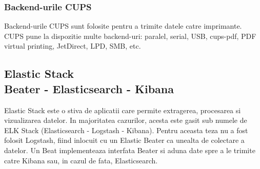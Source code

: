 \documentclass[12pt]{report}
\begin{document}
			\subsubsection{Backend-urile CUPS}
Backend-urile CUPS sunt folosite pentru a trimite datele catre imprimante. CUPS pune la dispozitie multe backend-uri: paralel, serial, USB, cups-pdf, PDF virtual printing, JetDirect, LPD, SMB, etc.
		
		
		\subsection[Elastic Stack]{Elastic Stack\\ {\normalsize Beater - Elasticsearch - Kibana}}
Elastic Stack este o stiva de aplicatii care permite extragerea, procesarea si vizualizarea datelor. In majoritatea cazurilor, acesta este gasit sub numele de ELK Stack (Elasticsearch - Logstash - Kibana). Pentru aceasta teza nu a fost folosit Logstash, fiind inlocuit cu un Elastic Beater ca unealta de colectare a datelor. Un Beat implementeaza interfata Beater si aduna date spre a le trimite catre Kibana sau, in cazul de fata, Elasticsearch.
\end{document}

